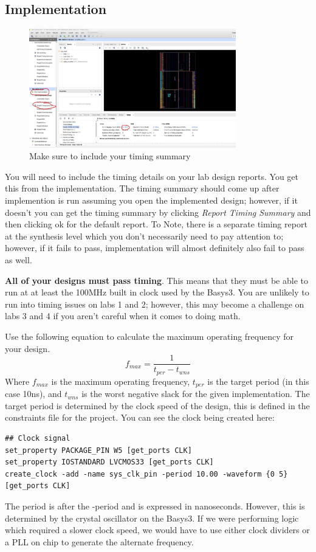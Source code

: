 \subsection{Implementation}
\begin{figure}[H]
    \centering
    \includegraphics[width=9cm]{Images/CreateProjectImages/Implementation.jpg}
    \caption{Make sure to include your timing summary}
    \label{fig:enter-label}
\end{figure}
You will need to include the timing details on your lab design reports. You get this from the implementation. The timing summary should come up after implemention is run assuming you open the implemented design; however, if it doesn't you can get the timing summary by clicking \textit{Report Timing Summary} and then clicking ok for the default report. To Note, there is a separate timing report at the synthesis level which you don't necessarily need to pay attention to; however, if it fails to pass, implementation will almost definitely also fail to pass as well. 

\vspace{1cm}
\textbf{All of your designs must pass timing}. This means that they must be able to run at at least the 100MHz built in clock used by the Basys3. You are unlikely to run into timing issues on labs 1 and 2; however, this may become a challenge on labs 3 and 4 if you aren't careful when it comes to doing math. 

\vspace{0.5cm}
Use the following equation to calculate the maximum operating frequency for your design.
\[f_{max} = \frac{1}{t_{per}-t_{wns}} \]
Where \(f_{max}\) is the maximum operating frequency, \(t_{per}\) is the target period (in this case 10ns), and \(t_{wns}\) is the worst negative slack for the given implementation. The target period is determined by the clock speed of the design, this is defined in the constraints file for the project. You can see the clock being created here:

\begin{small}
\begin{verbatim}
## Clock signal
set_property PACKAGE_PIN W5 [get_ports CLK]							
set_property IOSTANDARD LVCMOS33 [get_ports CLK]
create_clock -add -name sys_clk_pin -period 10.00 -waveform {0 5} [get_ports CLK]
\end{verbatim}
\end{small}
The period is after the -period and is expressed in nanoseconds. However, this is determined by the crystal oscillator on the Basys3. If we were performing logic which required a slower clock speed, we would have to use either clock dividers or a PLL on chip to generate the alternate frequency. 